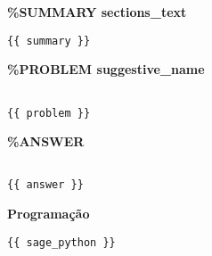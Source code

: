 



\noindent\textbf{\%SUMMARY {{ sections_text }} }

\begin{verbatim}
{{ summary }}
\end{verbatim}

\noindent\textbf{\%PROBLEM {{ suggestive_name }} }

\begin{verbatim}

{{ problem }}

\end{verbatim}

\noindent\textbf{\%ANSWER}

\begin{verbatim}

{{ answer }}

\end{verbatim}


\noindent\textbf{Programação}


\begin{lstlisting}
{{ sage_python }}
\end{lstlisting}






